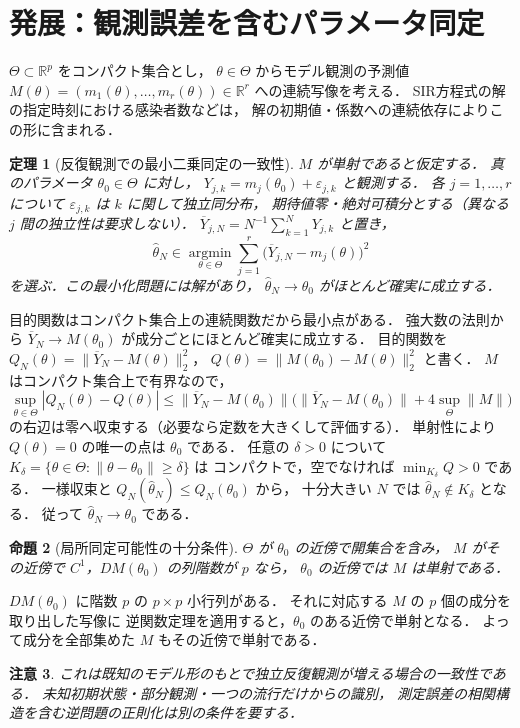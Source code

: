\documentclass[a5paper,10pt,onecolumn]{jsarticle}
\makeatletter
\theoremstyle{mathnotetheorem}
\newtheorem{theorem}{定理}[section]
\newtheorem{proposition}[theorem]{命題}
\newtheorem{remark}[theorem]{注意}
\renewcommand{\proofname}{証明}
\renewenvironment{proof}[1][\proofname]{%
  \par\pushQED{\qed}\normalfont\topsep4\p@\@plus2\p@\relax
  \trivlist\item[\hskip\labelsep\bfseries #1]\ignorespaces
}{\popQED\endtrivlist\@endpefalse}
\newcommand{\norm}[1]{\lVert #1\rVert}
\makeatother
\begin{document}
\section{発展：観測誤差を含むパラメータ同定}
$\Theta\subset\mathbb R^p$ をコンパクト集合とし，
$\theta\in\Theta$ からモデル観測の予測値
$M(\theta)=(m_1(\theta),\ldots,m_r(\theta))\in\mathbb R^r$
への連続写像を考える．
SIR方程式の解の指定時刻における感染者数などは，
解の初期値・係数への連続依存によりこの形に含まれる．
\begin{theorem}[反復観測での最小二乗同定の一致性]
$M$ が単射であると仮定する．
真のパラメータ $\theta_0\in\Theta$ に対し，
$Y_{j,k}=m_j(\theta_0)+\varepsilon_{j,k}$ と観測する．
各 $j=1,\ldots,r$ について
$\varepsilon_{j,k}$ は $k$ に関して独立同分布，
期待値零・絶対可積分とする（異なる $j$ 間の独立性は要求しない）．
$\overline Y_{j,N}=N^{-1}\sum_{k=1}^NY_{j,k}$ と置き，
\[
 \widehat\theta_N\in\operatorname*{argmin}_{\theta\in\Theta}
 \sum_{j=1}^r\bigl(\overline Y_{j,N}-m_j(\theta)\bigr)^2
\]
を選ぶ．この最小化問題には解があり，
$\widehat\theta_N\to\theta_0$ がほとんど確実に成立する．
\end{theorem}
\begin{proof}
目的関数はコンパクト集合上の連続関数だから最小点がある．
強大数の法則から
$\overline Y_N\to M(\theta_0)$ が成分ごとにほとんど確実に成立する．
目的関数を $Q_N(\theta)=\norm{\overline Y_N-M(\theta)}_2^2$，
$Q(\theta)=\norm{M(\theta_0)-M(\theta)}_2^2$ と書く．
$M$ はコンパクト集合上で有界なので，
\[
 \sup_{\theta\in\Theta}|Q_N(\theta)-Q(\theta)|
 \le\norm{\overline Y_N-M(\theta_0)}
 \bigl(\norm{\overline Y_N-M(\theta_0)}+4\sup_{\Theta}\norm{M}\bigr)
\]
の右辺は零へ収束する（必要なら定数を大きくして評価する）．
単射性により $Q(\theta)=0$ の唯一の点は $\theta_0$ である．
任意の $\delta>0$ について
$K_\delta=\{\theta\in\Theta:\norm{\theta-\theta_0}\ge\delta\}$ は
コンパクトで，空でなければ
$\min_{K_\delta}Q>0$ である．
一様収束と $Q_N(\widehat\theta_N)\le Q_N(\theta_0)$ から，
十分大きい $N$ では $\widehat\theta_N\notin K_\delta$ となる．
従って $\widehat\theta_N\to\theta_0$ である．
\end{proof}
\begin{proposition}[局所同定可能性の十分条件]
$\Theta$ が $\theta_0$ の近傍で開集合を含み，
$M$ がその近傍で $C^1$，$DM(\theta_0)$ の列階数が $p$ なら，
$\theta_0$ の近傍では $M$ は単射である．
\end{proposition}
\begin{proof}
$DM(\theta_0)$ に階数 $p$ の $p\times p$ 小行列がある．
それに対応する $M$ の $p$ 個の成分を取り出した写像に
逆関数定理を適用すると，$\theta_0$ のある近傍で単射となる．
よって成分を全部集めた $M$ もその近傍で単射である．
\end{proof}
\begin{remark}
これは既知のモデル形のもとで独立反復観測が増える場合の一致性である．
未知初期状態・部分観測・一つの流行だけからの識別，
測定誤差の相関構造を含む逆問題の正則化は別の条件を要する．
\end{remark}
\end{document}
